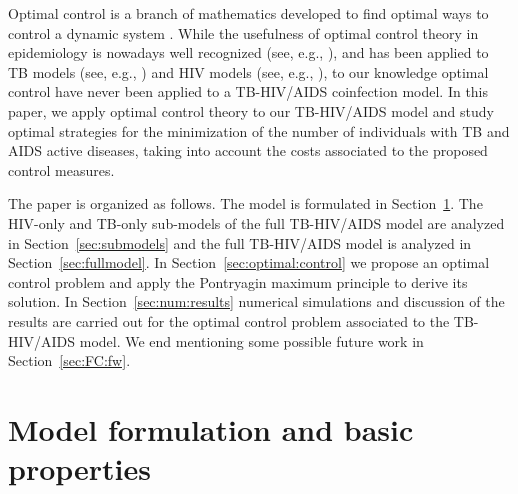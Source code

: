 \documentclass{my_aims}
\theoremstyle{definition}
\begin{document}
Optimal control is a branch of mathematics developed
to find optimal ways to control a dynamic system
\cite{Cesari_1983,Fleming_Rishel_1975,Pontryagin_et_all_1962}.
While the usefulness of optimal control theory in epidemiology is nowadays well recognized (see, e.g.,
\cite{MariaRPinho:SEIR:MBE:2014,UrszulaLed:OC:SIR:AIMS:2011,livro_Lenhart_2007,Rodrigues_Monteiro_Torres_2010,Rodrigues_Monteiro_Torres_Zinober_2011}),
and has been applied to TB models (see, e.g.,
\cite{Bowong_2010,Emvudu_et_all,Haffat_et_all,SLenhart_2002,Silva:Torres:TBOC:NACO:2012,Silva:Torres:TBOC:MBS:2013})
and HIV models (see, e.g., \cite{Kirschner:Lenhart:OC:HIV:JMB:1996,Magombedze:etall:OC:HIV:2009}),
to our knowledge optimal control have never been applied to a TB-HIV/AIDS coinfection model.
In this paper, we apply optimal control theory to our TB-HIV/AIDS model and study optimal strategies
for the minimization of the number of individuals with TB and AIDS active diseases, taking into account
the costs associated to the proposed control measures.

The paper is organized as follows. The model is formulated in Section~\ref{sec:model}.
The HIV-only and TB-only sub-models of the full TB-HIV/AIDS model are analyzed
in Section~\ref{sec:submodels} and the full TB-HIV/AIDS model is analyzed
in Section~\ref{sec:fullmodel}. In Section~\ref{sec:optimal:control}
we propose an optimal control problem and apply the Pontryagin maximum principle
to derive its solution. In Section~\ref{sec:num:results} numerical
simulations and discussion of the results are carried out for the optimal control
problem associated to the TB-HIV/AIDS model. We end mentioning some
possible future work in Section~\ref{sec:FC:fw}.

\section{Model formulation and basic properties}
\label{sec:model}
\end{document}
